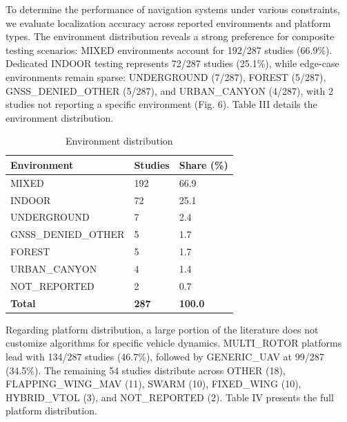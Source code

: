 \documentclass[conference]{IEEEtran}
\begin{document}
To determine the performance of navigation systems under various constraints, we evaluate localization accuracy across reported environments and platform types. The environment distribution reveals a strong preference for composite testing scenarios: MIXED environments account for 192/287 studies (66.9\%). Dedicated INDOOR testing represents 72/287 studies (25.1\%), while edge-case environments remain sparse: UNDERGROUND (7/287), FOREST (5/287), GNSS\_DENIED\_OTHER (5/287), and URBAN\_CANYON (4/287), with 2 studies not reporting a specific environment (Fig. 6). Table III details the environment distribution.



\begin{table}[htbp]
\centering
\caption{Environment distribution}
\label{tab:3}
\begin{tabular}{l l l}
\hline
Environment & Studies & Share (\%) \\
\hline
MIXED & 192 & 66.9 \\
\hline
INDOOR & 72 & 25.1 \\
\hline
UNDERGROUND & 7 & 2.4 \\
\hline
GNSS\_DENIED\_OTHER & 5 & 1.7 \\
\hline
FOREST & 5 & 1.7 \\
\hline
URBAN\_CANYON & 4 & 1.4 \\
\hline
NOT\_REPORTED & 2 & 0.7 \\
\hline
\textbf{Total} & \textbf{287} & \textbf{100.0} \\
\hline
\end{tabular}
\end{table}



Regarding platform distribution, a large portion of the literature does not customize algorithms for specific vehicle dynamics. MULTI\_ROTOR platforms lead with 134/287 studies (46.7\%), followed by GENERIC\_UAV at 99/287 (34.5\%). The remaining 54 studies distribute across OTHER (18), FLAPPING\_WING\_MAV (11), SWARM (10), FIXED\_WING (10), HYBRID\_VTOL (3), and NOT\_REPORTED (2). Table IV presents the full platform distribution.
\end{document}
